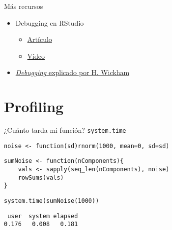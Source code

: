 \documentclass[xcolor={usenames,svgnames,dvipsnames}]{beamer}
\begin{document}
\begin{frame}[label={sec:orgheadline24}]{Más recursos}
\begin{itemize}
\item Debugging en RStudio
\begin{itemize}
\item \href{https://support.rstudio.com/hc/en-us/articles/205612627-Debugging-with-RStudio}{Artículo}
\item \href{https://vimeo.com/97831988}{Vídeo}
\end{itemize}
\item \href{http://adv-r.had.co.nz/Exceptions-Debugging.html}{\emph{Debugging} explicado por H. Wickham}
\end{itemize}
\end{frame}

\section{Profiling}
\label{sec:orgheadline29}
\begin{frame}[fragile,label={sec:orgheadline26}]{¿Cuánto tarda mi función? \texttt{system.time}}
 \lstset{language=R,label= ,caption= ,captionpos=b,numbers=none}
\begin{lstlisting}
noise <- function(sd)rnorm(1000, mean=0, sd=sd)
\end{lstlisting}

\lstset{language=R,label= ,caption= ,captionpos=b,numbers=none}
\begin{lstlisting}
sumNoise <- function(nComponents){
    vals <- sapply(seq_len(nComponents), noise)
    rowSums(vals)
}
\end{lstlisting}

\lstset{language=R,label= ,caption= ,captionpos=b,numbers=none}
\begin{lstlisting}
system.time(sumNoise(1000))
\end{lstlisting}

\begin{verbatim}
 user  system elapsed 
0.176   0.008   0.181
\end{verbatim}
\end{frame}
\end{document}
